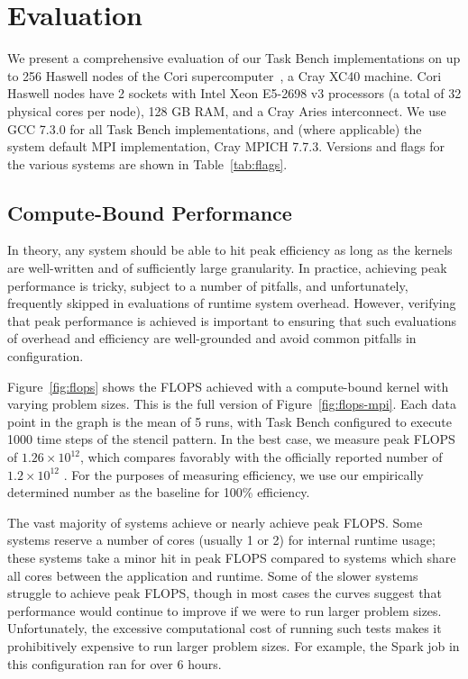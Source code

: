 \section{Evaluation}
\label{sec:evaluation}



We present a comprehensive evaluation of our Task Bench implementations on up to 256
Haswell nodes of the Cori supercomputer~\cite{Cori}, a Cray XC40
machine. Cori Haswell nodes have 2 sockets with Intel Xeon E5-2698 v3
processors (a total of 32 physical cores per node), 128 GB RAM, and a
Cray Aries interconnect. We use GCC 7.3.0 for all Task Bench
implementations, and (where applicable) the system default MPI
implementation, Cray MPICH 7.7.3. Versions and flags for the
various systems are shown in Table~\ref{tab:flags}.

\subsection{Compute-Bound Performance}
\label{subsec:peak-performance-and-efficiency}

In theory, any system should be able to hit peak efficiency as long as
the kernels are well-written and of sufficiently large granularity. In
practice, achieving peak performance is tricky, subject to a number of
pitfalls, and unfortunately, frequently skipped in evaluations of
runtime system overhead. However, verifying that peak performance is
achieved is important to ensuring that such evaluations of overhead and
efficiency are well-grounded and avoid common pitfalls in
configuration.

Figure~\ref{fig:flops} shows the FLOPS achieved with a compute-bound
kernel with varying problem sizes. This is the full version of
Figure~\ref{fig:flops-mpi}. Each data point in the graph is the mean of 5 runs, with Task Bench configured to execute 1000 time steps of the stencil pattern. In the best case, we measure peak FLOPS of
$1.26 \times 10^{12}$, which compares favorably with the officially
reported number of $1.2 \times 10^{12}$ \cite{Cori}. For the purposes
of measuring efficiency, we use our empirically determined number as
the baseline for 100\% efficiency.




The vast majority of systems achieve or nearly achieve peak FLOPS. Some
systems reserve a number of cores (usually 1 or 2) for internal
runtime usage; these systems take a minor hit in peak FLOPS compared
to systems which share all cores between the application and runtime. Some of the
slower systems struggle to achieve peak FLOPS, though in most cases
the curves suggest that performance would continue to improve if we
were to run larger problem sizes. Unfortunately, the excessive
computational cost of running such tests makes it prohibitively
expensive to run larger problem sizes. For example, the Spark job in
this configuration ran for over 6 hours.

